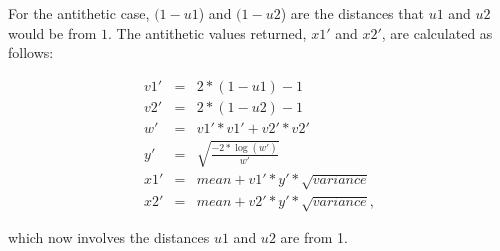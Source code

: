 For the antithetic case, $(1 - u1$) and $(1 - u2$) are the distances that $u1$ and $u2$ would be from $1$. The antithetic values returned, $x1'$ and $x2'$, are calculated as follows\+:

\begin{eqnarray*} v1' & = & 2 * (1 - u1) - 1 \\ v2' & = & 2 * (1 - u2) - 1 \\ w' & = & v1' * v1' + v2' * v2' \\ y' & = & \sqrt{\frac{-2 * \log(w')}{w'}} \\ x1' & = & mean + v1' * y' * \sqrt{variance} \\ x2' & = & mean + v2' * y' * \sqrt{variance} , \end{eqnarray*}

which now involves the distances $u1$ and $u2$ are from 1. 
